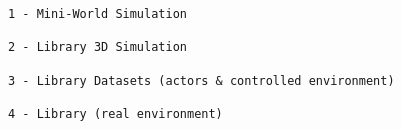 \begin{verbatim}
1 - Mini-World Simulation

2 - Library 3D Simulation

3 - Library Datasets (actors & controlled environment)

4 - Library (real environment)
\end{verbatim}








